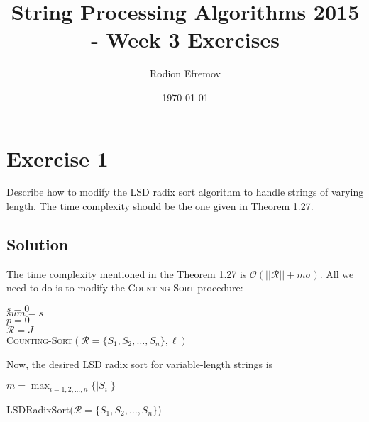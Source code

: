 \documentclass[10pt]{article}
\title{String Processing Algorithms 2015 - Week 3 Exercises}
\author{Rodion Efremov}
\date{\today}
\begin{document}
\maketitle

\section*{Exercise 1}
\color{blue}
Describe how to modify the LSD radix sort algorithm to handle strings of varying length. The time complexity should be the one given in Theorem 1.27.
\color{black}

\subsection*{Solution}
The time complexity mentioned in the Theorem 1.27 is $\mathcal{O}(||\mathcal{R}|| + m\sigma)$. All we need to do is to modify the \textsc{Counting-Sort} procedure:

\begin{algorithm}

$s = 0$ \\
$sum = s$ \\
$p = 0$ \\
$\mathcal{R} = J$ \\
\caption{\textsc{Counting-Sort}$(\mathcal{R} = \{ S_1, S_2, \dots, S_n \}, \ell)$}
\end{algorithm}
Now, the desired LSD radix sort for variable-length strings is
\begin{algorithm}
$m = \max_{i = 1, 2, \dots, n} \{ |S_i| \}$ \\
\caption{LSDRadixSort($\mathcal{R} = \{ S_1, S_2, \dots, S_n \}$)}
\end{algorithm}
\end{document}
